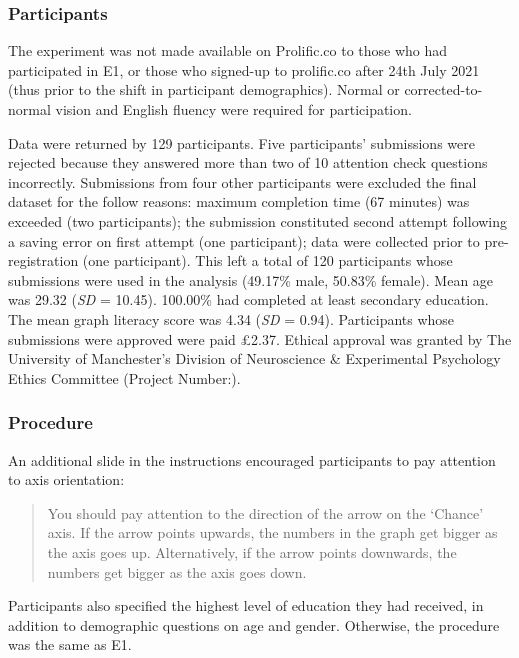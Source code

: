 \documentclass[journal]{vgtc}                %
\begin{document}
\hypertarget{participants-1}{%
\subsubsection{Participants}\label{participants-1}}

The experiment was not made available on Prolific.co to those who had participated in E1, or those who signed-up to prolific.co after 24th July 2021 (thus prior to the shift in participant demographics). Normal or corrected-to-normal vision and English fluency were required for participation.

Data were returned by 129 participants. Five participants' submissions were rejected because they answered more than two of 10 attention check questions incorrectly. Submissions from four other participants were excluded the final dataset for the follow reasons: maximum completion time (67 minutes) was exceeded (two participants); the submission constituted second attempt following a saving error on first attempt (one participant); data were collected prior to pre-registration (one participant). This left a total of 120 participants whose submissions were used in the analysis (49.17\% male, 50.83\% female). Mean age was 29.32 (\emph{SD} = 10.45). 100.00\% had completed at least secondary education. The mean graph literacy score was 4.34 (\emph{SD} = 0.94). Participants whose submissions were approved were paid £2.37. Ethical approval was granted by The University of Manchester's Division of Neuroscience \& Experimental Psychology Ethics Committee (Project Number:).

\hypertarget{procedure-1}{%
\subsubsection{Procedure}\label{procedure-1}}

An additional slide in the instructions encouraged participants to pay attention to axis orientation:

\begin{quote}
You should pay attention to the direction of the arrow on the `Chance' axis. If the arrow points upwards, the numbers in the graph get bigger as the axis goes up. Alternatively, if the arrow points downwards, the numbers get bigger as the axis goes down.
\end{quote}

Participants also specified the highest level of education they had received, in addition to demographic questions on age and gender. Otherwise, the procedure was the same as E1.
\end{document}
